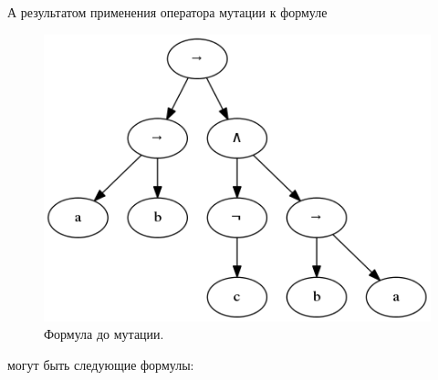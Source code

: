 \documentclass[12pt,fleqn]{article}
\begin{document}
\FloatBarrier

А результатом применения оператора мутации к формуле

\FloatBarrier

\begin{figure}[!h]
  \centering
  \includegraphics[scale=0.3]{t5.png}
  \caption{Формула до мутации.}
\end{figure}

\FloatBarrier

могут быть следующие формулы:

\FloatBarrier
\end{document}
